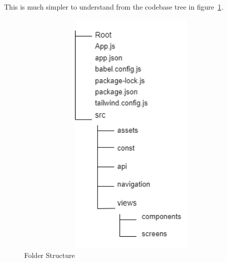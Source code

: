 This is much simpler to understand from the codebase tree in figure~\ref{fig:codebase}.
\begin{figure}[H]
	\centering
	\includegraphics[width=1\textwidth,width=6cm, height=12cm]{images/codebase_tree.png}
	\caption{Folder Structure}
	\label{fig:codebase}
\end{figure}
\bigskip
